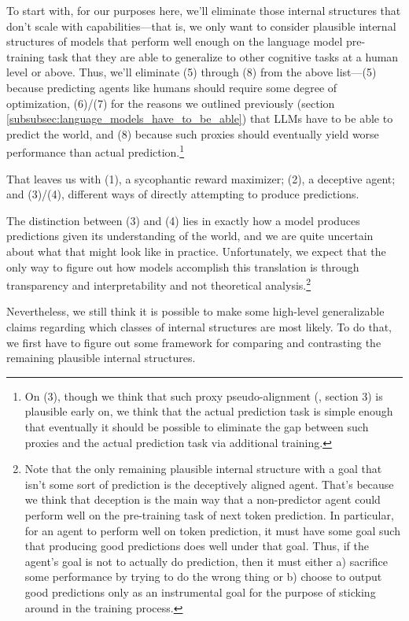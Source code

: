 \documentclass[
  onecolumn,
  natbib,
]{miri-tech-article}
\begin{document}
To start with, for our purposes here, we'll eliminate those internal structures that don't scale with capabilities---that is, we only want to consider plausible internal structures of models that perform well enough on the language model pre-training task that they are able to generalize to other cognitive tasks at a human level or above. Thus, we'll eliminate (5) through (8)  from the above list---(5) because predicting agents like humans should require some degree of optimization, (6)/(7) for the reasons we outlined previously (section \ref{subsubsec:language_models_have_to_be_able}) that LLMs have to be able to predict the world, and (8) because such proxies should eventually yield worse performance than actual prediction.\footnote{On (3), though we think that such proxy pseudo-alignment (\cite{risks}, section 3) is plausible early on, we think that the actual prediction task is simple enough that eventually it should be possible to eliminate the gap between such proxies and the actual prediction task via additional training.}

That leaves us with (1), a sycophantic\cite{why_ai_alignment_hard} reward maximizer; (2), a deceptive agent; and (3)/(4), different ways of directly attempting to produce predictions.

The distinction between (3) and (4) lies in exactly how a model produces predictions given its understanding of the world, and we are quite uncertain about what that might look like in practice. Unfortunately, we expect that the only way to figure out how models accomplish this translation is through transparency and interpretability and not theoretical analysis.\footnote{Note that the only remaining plausible internal structure with a goal that isn't some sort of prediction is the deceptively aligned agent. That's because we think that deception is the main way that a non-predictor agent could perform well on the pre-training task of next token prediction. In particular, for an agent to perform well on token prediction, it must have some goal such that producing good predictions does well under that goal. Thus, if the agent's goal is not to actually do prediction, then it must either a) sacrifice some performance by trying to do the wrong thing or b) choose to output good predictions only as an instrumental goal for the purpose of sticking around in the training process.}

Nevertheless, we still think it is possible to make some high-level generalizable claims regarding which classes of internal structures are most likely. To do that, we first have to figure out some framework for comparing and contrasting the remaining plausible internal structures.
\end{document}
